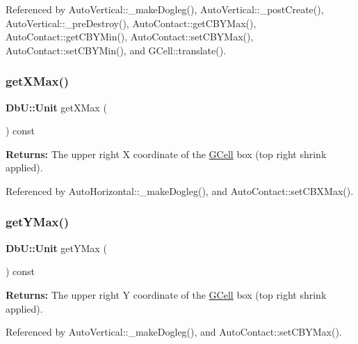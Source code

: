 Referenced by Auto\+Vertical\+::\+\_\+make\+Dogleg(), Auto\+Vertical\+::\+\_\+post\+Create(), Auto\+Vertical\+::\+\_\+pre\+Destroy(), Auto\+Contact\+::get\+C\+B\+Y\+Max(), Auto\+Contact\+::get\+C\+B\+Y\+Min(), Auto\+Contact\+::set\+C\+B\+Y\+Max(), Auto\+Contact\+::set\+C\+B\+Y\+Min(), and G\+Cell\+::translate().

\mbox{\label{classKatabatic_1_1GCell_aaf7ff16cd2fd5a3fa4c5221efb9b9b76}} 
\subsubsection{\texorpdfstring{get\+X\+Max()}{getXMax()}}
{\footnotesize\ttfamily \textbf{ Db\+U\+::\+Unit} get\+X\+Max (\begin{DoxyParamCaption}{ }\end{DoxyParamCaption}) const\hspace{0.3cm}{\ttfamily [inline]}}

{\bfseries Returns\+:} The upper right X coordinate of the \hyperlink{classKatabatic_1_1GCell}{G\+Cell} box (top right shrink applied). 

Referenced by Auto\+Horizontal\+::\+\_\+make\+Dogleg(), and Auto\+Contact\+::set\+C\+B\+X\+Max().

\mbox{\label{classKatabatic_1_1GCell_a096a92c18156eac4268efb50496a2d18}} 
\subsubsection{\texorpdfstring{get\+Y\+Max()}{getYMax()}}
{\footnotesize\ttfamily \textbf{ Db\+U\+::\+Unit} get\+Y\+Max (\begin{DoxyParamCaption}{ }\end{DoxyParamCaption}) const\hspace{0.3cm}{\ttfamily [inline]}}

{\bfseries Returns\+:} The upper right Y coordinate of the \hyperlink{classKatabatic_1_1GCell}{G\+Cell} box (top right shrink applied). 

Referenced by Auto\+Vertical\+::\+\_\+make\+Dogleg(), and Auto\+Contact\+::set\+C\+B\+Y\+Max().

